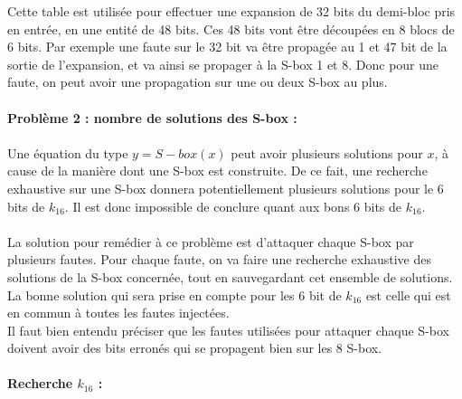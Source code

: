 				Cette table est utilisée pour effectuer une expansion de 32 bits du demi-bloc pris en entrée, en une entité de 48 bits. Ces 48 bits vont être découpées en 8 blocs de 6 bits. Par exemple une faute sur le 32 bit va être propagée au 1 et 47 bit de la sortie de l'expansion, et va ainsi se propager à la S-box 1 et 8. Donc pour une faute, on peut avoir une propagation sur une ou deux S-box au plus.
				
			\paragraph{Problème 2 : nombre de solutions des S-box :}
				\paragraph{} Une équation du type $y = S-box(x)$ peut avoir plusieurs solutions pour $x$, à cause de la manière dont une S-box est construite. De ce fait, une recherche exhaustive sur une S-box donnera potentiellement plusieurs solutions pour le 6 bits de $k_{16}$. Il est donc impossible de conclure quant aux bons 6 bits de $k_{16}$.
				
				\paragraph{} La solution pour remédier à ce problème est d'attaquer chaque S-box par plusieurs fautes. Pour chaque faute, on va faire une recherche exhaustive des solutions de la S-box concernée, tout en sauvegardant cet ensemble de solutions. La bonne solution qui sera prise en compte pour les 6 bit de $k_{16}$ est celle qui est en commun à toutes les fautes injectées.\\
				Il faut bien entendu préciser que les fautes utilisées pour attaquer chaque S-box doivent avoir des bits erronés qui se propagent bien sur les 8 S-box.
				
				
			\paragraph{Recherche $k_{16}$ :}
			
